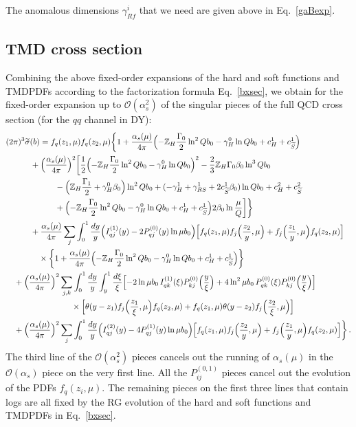 \documentclass[a4,letterpaper,11pt]{article}
\newcommand{\nn}{\nonumber}
\newcommand{\as}{\alpha_s}
\newcommand{\cO}{\mathcal{O}}
\newcommand{\zed}{\mathbb{Z}}
\newcommand{\wt}{\widetilde}
\newcommand{\eq}[1]{Eq.~\eqref{#1}}
\begin{document}
The anomalous dimensions $\gamma_{Rf}^i$ that we need are given above in \eq{gaBexp}.

\subsection{TMD cross section}

Combining the above fixed-order expansions of the hard and soft functions and TMDPDFs according to the factorization formula \eq{bxsec}, we obtain for the fixed-order expansion up to $\cO(\as^2)$ of the singular pieces of the full QCD cross section (for the $qq$ channel in DY):
\begin{align}\label{sing}
&(2\pi)^3 \widetilde \sigma(b) = f_q(z_1,\mu)f_q(z_2,\mu) \biggl\{ 1 + \frac{\as(\mu)}{4\pi}\Bigl(-\zed_H \frac{\Gamma_0}{2} \ln^2 Qb_0 - \gamma_H^0 \ln Qb_0 + c_H^1 + c_{\wt S}^1\Bigr) \\
&\qquad\quad + \Bigl(\frac{\as(\mu)}{4\pi}\Bigr)^2  \biggl[ \frac{1}{2}\Bigl(-\zed_H \frac{\Gamma_0}{2} \ln^2 Qb_0 - \gamma_H^0 \ln Qb_0\Bigr)^2 - \frac{2}{3}\zed_H\Gamma_0\beta_0 \ln^3 Qb_0  \nn \\
&\qquad\qquad\qquad - \Bigl(\zed_H\frac{\Gamma_1}{2} + \gamma_H^0\beta_0\Bigr)\ln^2 Qb_0 + ( -\gamma_H^1 + \gamma_{RS}^1 + 2c_{\wt S}^1 \beta_0)\ln Qb_0 + c_H^2 + c_{\wt S}^2 \nn \\
&\qquad\qquad\qquad + \Bigl(-\zed_H \frac{\Gamma_0}{2} \ln^2 Qb_0 - \gamma_H^0 \ln Qb_0 + c_H^1 + c_{\wt S}^1\Bigr)2\beta_0\ln\frac{\mu}{Q}\biggr]\biggr\} \nn \\
&\qquad\quad + \frac{\as(\mu)}{4\pi}\sum_j \int_{0}^1\frac{dy}{y}\Bigl(I_{qj}^{(1)}(y) - 2P_{qj}^{(0)}(y)\ln\mu b_0\Bigr) \Bigl[ f_q(z_1,\mu)  f_j\Bigl(\frac{z_2}{y},\mu\Bigr)  + f_j\Bigl(\frac{z_1}{y},\mu\Bigr) f_q(z_2,\mu)\Bigr] \nn \\
&\qquad\qquad \times \biggl\{ 1+ \frac{\as(\mu)}{4\pi} \Bigl(  -\zed_H \frac{\Gamma_0}{2} \ln^2 Qb_0 - \gamma_H^0 \ln Qb_0 + c_H^1 + c_{\wt S}^1\Bigr)\biggr\} \nn \\
&\quad +\Bigl(\frac{\as(\mu)}{4\pi}\Bigr)^2 \sum_{j,k}\int_0^1\frac{dy}{y}\int_y^1\frac{d\xi}{\xi} \Bigl[ -2\ln\mu b_0\,  I_{qk}^{(1)}(\xi) P_{kj}^{(0)}\Bigl(\frac{y}{\xi}\Bigr) + 4\ln^2\mu b_0\, P_{qk}^{(0)}(\xi)P_{kj}^{(0)}\Bigl(\frac{y}{\xi}\Bigr)\Bigr] \nn \\
&\qquad\qquad\qquad\qquad \times \Bigl[\theta(y-z_1)f_j\Bigl(\frac{z_1}{\xi},\mu\Bigr) f_q(z_2,\mu) + f_q(z_1,\mu)\theta(y-z_2)f_j\Bigl(\frac{z_2}{\xi},\mu\Bigr)\Bigr] \nn \\
&\quad +\Bigl(\frac{\as(\mu)}{4\pi}\Bigr)^2  \sum_j \int_{0}^1\frac{dy}{y}\Bigl(I_{qj}^{(2)}(y) - 4P_{qj}^{(1)}(y)\ln\mu b_0\Bigr) \Bigl[ f_q(z_1,\mu)  f_j\Bigl(\frac{z_2}{y},\mu\Bigr)  + f_j\Bigl(\frac{z_1}{y},\mu\Bigr) f_q(z_2,\mu)\Bigr]\biggr\} \,. \nn
\end{align}
The third line of the $\cO(\as^2)$ pieces cancels out the running of $\as(\mu)$ in the $\cO(\as)$ piece on the very first line. All the $P_{ij}^{(0,1)}$ pieces cancel out the evolution of the PDFs $f_q(z_i,\mu)$. The remaining pieces on the first three lines that contain logs are all fixed by the RG evolution of the hard and soft functions and TMDPDFs in \eq{bxsec}.
\end{document}
